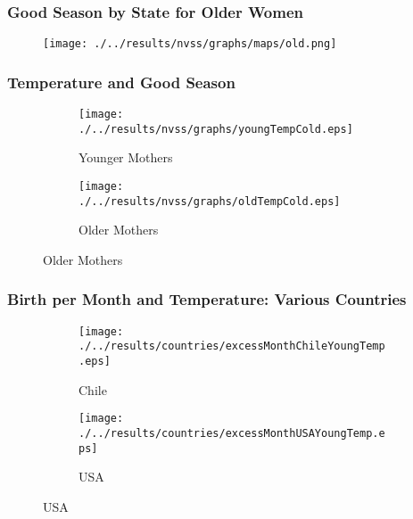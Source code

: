 \documentclass[10pt,letterpaper,subeqn]{beamer}
\begin{document}
\begin{frame}
\frametitle{Good Season by State for Older Women}
\begin{figure}[htpb!]
\begin{center}
  \centering
  \texttt{[image: ./../results/nvss/graphs/maps/old.png]}
  \label{fig:mapOld}
\end{center}
\end{figure}
\end{frame}

\begin{frame}
\frametitle{Temperature and Good Season}
\begin{figure}[htpb!]
\begin{center}
\label{fig:tempUSA}
\begin{subfigure}{.5\textwidth}
  \centering
  \texttt{[image: ./../results/nvss/graphs/youngTempCold.eps]}
  \caption{Younger Mothers}
  \label{fig:tempUSAYoung}
\end{subfigure}%
\begin{subfigure}{.5\textwidth}
  \centering
  \texttt{[image: ./../results/nvss/graphs/oldTempCold.eps]}
  \caption{Older Mothers}
  \label{fig:tempUSAOld}
\end{subfigure}
\end{center}
\end{figure}
\end{frame}

\begin{frame}
\frametitle{Birth per Month and Temperature: Various Countries}
\begin{figure}[htpb!]
\begin{center}
\begin{subfigure}{.5\textwidth}
  \centering
  \texttt{[image: ./../results/countries/excessMonthChileYoungTemp.eps]}
  \caption{Chile}
  \label{fig:ChileTemp}
\end{subfigure}%
\begin{subfigure}{.5\textwidth}
  \centering
  \texttt{[image: ./../results/countries/excessMonthUSAYoungTemp.eps]}
  \caption{USA}
  \label{fig:USATemp}
\end{subfigure}
\end{center}
\end{figure}
\end{frame}
\end{document}
